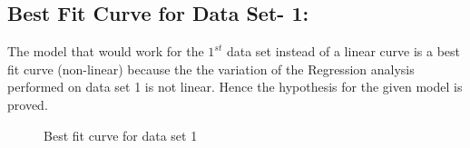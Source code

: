 \documentclass[12pt,a4paper]{article}
\begin{document}
\subsection{Best Fit Curve for Data Set- 1:}
The model that would work for the $1^{st}$ data set instead of a linear curve is a best fit curve (non-linear) because the the variation of the Regression analysis performed on data set 1 is not linear. Hence the hypothesis for the given model is proved.
\begin{figure}[!ht]
	\begin{center}
	\end{center}
	\caption{Best fit curve for data set 1}
	\label{Best fit curve for data set 1}
\end{figure}
\end{document}
